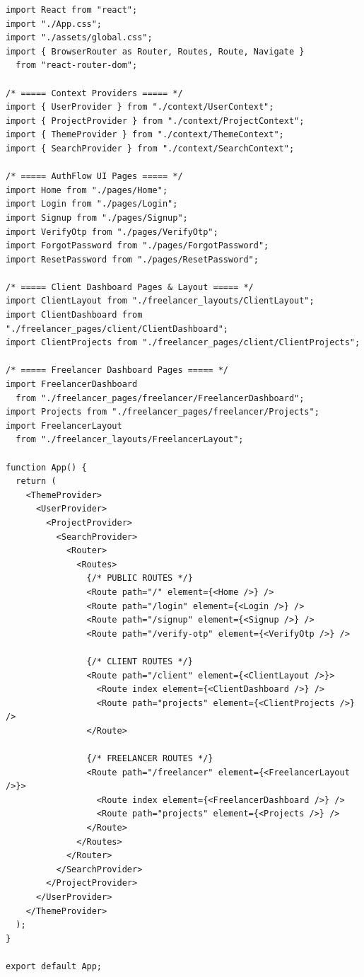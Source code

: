 \documentclass[12pt,a4paper,oneside]{report}
\numberwithin{figure}{chapter}
\numberwithin{table}{chapter}
\begin{document}
\begin{verbatim}
import React from "react";
import "./App.css";
import "./assets/global.css";
import { BrowserRouter as Router, Routes, Route, Navigate }
  from "react-router-dom";

/* ===== Context Providers ===== */
import { UserProvider } from "./context/UserContext";
import { ProjectProvider } from "./context/ProjectContext";
import { ThemeProvider } from "./context/ThemeContext";
import { SearchProvider } from "./context/SearchContext";

/* ===== AuthFlow UI Pages ===== */
import Home from "./pages/Home";
import Login from "./pages/Login";
import Signup from "./pages/Signup";
import VerifyOtp from "./pages/VerifyOtp";
import ForgotPassword from "./pages/ForgotPassword";
import ResetPassword from "./pages/ResetPassword";

/* ===== Client Dashboard Pages & Layout ===== */
import ClientLayout from "./freelancer_layouts/ClientLayout";
import ClientDashboard from "./freelancer_pages/client/ClientDashboard";
import ClientProjects from "./freelancer_pages/client/ClientProjects";

/* ===== Freelancer Dashboard Pages ===== */
import FreelancerDashboard
  from "./freelancer_pages/freelancer/FreelancerDashboard";
import Projects from "./freelancer_pages/freelancer/Projects";
import FreelancerLayout
  from "./freelancer_layouts/FreelancerLayout";

function App() {
  return (
    <ThemeProvider>
      <UserProvider>
        <ProjectProvider>
          <SearchProvider>
            <Router>
              <Routes>
                {/* PUBLIC ROUTES */}
                <Route path="/" element={<Home />} />
                <Route path="/login" element={<Login />} />
                <Route path="/signup" element={<Signup />} />
                <Route path="/verify-otp" element={<VerifyOtp />} />

                {/* CLIENT ROUTES */}
                <Route path="/client" element={<ClientLayout />}>
                  <Route index element={<ClientDashboard />} />
                  <Route path="projects" element={<ClientProjects />} />
                </Route>

                {/* FREELANCER ROUTES */}
                <Route path="/freelancer" element={<FreelancerLayout />}>
                  <Route index element={<FreelancerDashboard />} />
                  <Route path="projects" element={<Projects />} />
                </Route>
              </Routes>
            </Router>
          </SearchProvider>
        </ProjectProvider>
      </UserProvider>
    </ThemeProvider>
  );
}

export default App;
\end{verbatim}
\end{document}
